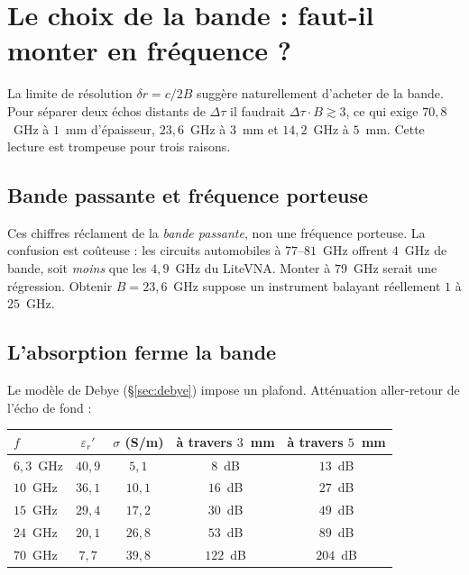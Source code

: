 \documentclass[11pt,a4paper]{article}
\newcommand{\eps}{\varepsilon_r}
\begin{document}
\section{Le choix de la bande : faut-il monter en fréquence ?}
\label{sec:bande}

La limite de résolution $\delta r = c/2B$ suggère naturellement d'acheter de la
bande. Pour séparer deux échos distants de $\Delta\tau$ il faudrait
$\Delta\tau \cdot B \gtrsim 3$, ce qui exige $70{,}8$~GHz à $1$~mm d'épaisseur,
$23{,}6$~GHz à $3$~mm et $14{,}2$~GHz à $5$~mm. Cette lecture est trompeuse pour
trois raisons.

\subsection{Bande passante et fréquence porteuse}

Ces chiffres réclament de la \emph{bande passante}, non une fréquence porteuse.
La confusion est coûteuse : les circuits automobiles à $77$--$81$~GHz offrent
$4$~GHz de bande, soit \emph{moins} que les $4{,}9$~GHz du LiteVNA. Monter à
$79$~GHz serait une régression. Obtenir $B = 23{,}6$~GHz suppose un instrument
balayant réellement $1$ à $25$~GHz.

\subsection{L'absorption ferme la bande}

Le modèle de Debye (\S\ref{sec:debye}) impose un plafond. Atténuation
aller-retour de l'écho de fond :

\begin{table}[h]
\centering
\begin{tabular}{lcccc}
\toprule
$f$ & $\eps'$ & $\sigma$ (S/m) & à travers $3$~mm & à travers $5$~mm \\
\midrule
$6{,}3$~GHz & $40{,}9$ & $5{,}1$  & $8$~dB   & $13$~dB \\
$10$~GHz    & $36{,}1$ & $10{,}1$ & $16$~dB  & $27$~dB \\
$15$~GHz    & $29{,}4$ & $17{,}2$ & $30$~dB  & $49$~dB \\
$24$~GHz    & $20{,}1$ & $26{,}8$ & $53$~dB  & $89$~dB \\
$70$~GHz    & $7{,}7$  & $39{,}8$ & $122$~dB & $204$~dB \\
\bottomrule
\end{tabular}
\end{table}
\end{document}

